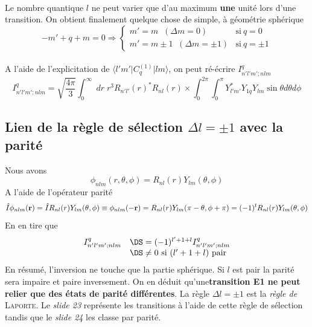 \ \\

Le nombre quantique $l$ ne peut varier que d'au maximum \textbf{une} unité lors d'une transition.
On obtient finalement quelque chose de simple, à géométrie sphérique
\begin{equation}
-m' + q + m = 0 \Rightarrow
\left\{ \begin{array}{ll}
m' = m \; \; (\Delta m = 0) & \mbox{si}~q = 0 \\
m' = m \pm 1 \; \; (\Delta m = \pm 1) &\mbox{si}~q = \pm 1
\end{array} \right.
\end{equation}\ \\

A l'aide de l'explicitation de $\langle l' m' \vert C^{(1)}_q \vert l m \rangle$, on peut 
ré-écrire $I^q_{n'l'm';nlm}$
\begin{equation}
I^q_{n'l'm';nlm} =  \sqrt{\frac{4 \pi}{3}} \int_0 ^\infty
\; dr \; r^3 R_{n'l'}(r)^\ast  R_{nl}(r)\times \int_0^{2 \pi} \int_0^{\pi}
Y^\ast_{l'm'} Y_{1q} Y_{lm} \sin \theta d\theta d\phi
\end{equation}


\subsection{Lien de la règle de sélection $\Delta l = \pm 1$ avec la parité}
Nous avons
\begin{equation}
\phi_{ n l m }(r, \theta, \phi) = R_{nl} (r) Y_{lm} (\theta, \phi)
\end{equation}
A l'aide de l'opérateur parité
\begin{equation}
\hat{I} \phi_{ n l m }({\bf r}) = 
\hat{I} R_{nl} (r) Y_{lm} (\theta, \phi)
\equiv 
\phi_{ n l m }( - {\bf r})=
R_{nl} (r) Y_{lm} (\pi - \theta, \phi + \pi)
=  (-1)^l R_{nl} (r) Y_{lm} (\theta, \phi)
\end{equation}
En en tire que
\begin{equation}
\begin{array}{ll}
I^q_{n'l'm';nlm} &\DS=  (-1)^{l' + 1 + l}  I^q_{n'l'm';nlm}\\
&\DS \neq 0 ~\mbox{si}~(l' +1 + l)~\mbox{pair} 
\end{array}
\end{equation}
En résumé, l'inversion ne touche que la partie sphérique. Si $l$ est pair la parité sera impaire
et paire inversement. On en déduit qu'une\textbf{transition E1 ne peut relier que des états de
parité différentes}. La règle $\Delta l=\pm1$ est la \textit{règle de }\textsc{Laporte}. Le
\textit{slide 23} représente les transitions à l'aide de cette règle de sélection tandis que 
le \textit{slide 24} les classe par parité.


